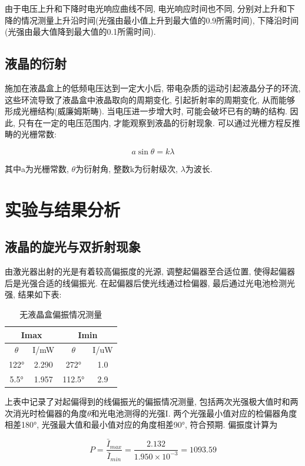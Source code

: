 \documentclass[12pt,a4paper]{article}
\newcommand{\be}[1]{
    \begin{equation}
        #1
    \end{equation}
}
\begin{document}
由于电压上升和下降时电光响应曲线不同, 电光响应时间也不同, 分别对上升和下降的情况测量上升沿时间(光强由最小值上升到最大值的0.9所需时间), 下降沿时间(光强由最大值降到最大值的0.1所需时间).

\subsection{液晶的衍射}
施加在液晶盒上的低频电压达到一定大小后, 带电杂质的运动引起液晶分子的环流, 这些环流导致了液晶盒中液晶取向的周期变化, 引起折射率的周期变化, 从而能够形成光栅结构(威廉姆斯畴). 当电压进一步增大时, 可能会破坏已有的畴的结构. 因此, 只有在一定的电压范围内, 
才能观察到液晶的衍射现象. 可以通过光栅方程反推畴的光栅常数: 
\be{a\sin{\theta}=k\lambda}
其中a为光栅常数, $\theta$为衍射角, 整数k为衍射级次, $\lambda$为波长. 
\section{实验与结果分析}
\subsection{液晶的旋光与双折射现象}
由激光器出射的光是有着较高偏振度的光源, 调整起偏器至合适位置, 使得起偏器后是光强合适的线偏振光. 
在起偏器后使光线通过检偏器, 最后通过光电池检测光强, 结果如下表: 
\begin{table}[H]
    \centering
    \begin{tabular}{|cc|cc|}
    \hline
    \multicolumn{2}{|c|}{Imax}          & \multicolumn{2}{c|}{Imin}         \\ \hline
    \multicolumn{1}{|c|}{$\theta$} & I/mW   & \multicolumn{1}{c|}{$\theta$}  & I/uW \\ \hline
    \multicolumn{1}{|c|}{122°}  & 2.290 & \multicolumn{1}{c|}{272°}   & 1.0 \\ \hline
    \multicolumn{1}{|c|}{5.5°} & 1.957 & \multicolumn{1}{c|}{112.5°} & 2.9 \\ \hline
    \end{tabular}
    \caption{无液晶盒偏振情况测量}
    \end{table}
上表中记录了对起偏得到的线偏振光的偏振情况测量, 包括两次光强极大值时和两次消光时检偏器的角度$\theta$和光电池测得的光强I. 
两个光强最小值对应的检偏器角度相差180°, 光强最大值和最小值对应的角度相差90°, 符合预期. 偏振度计算为
\be{P=\frac{\bar{I}_{max}}{\bar{I}_{min}}=\frac{2.132}{1.950\times 10^{-3}}=1093.59}
\end{document}
